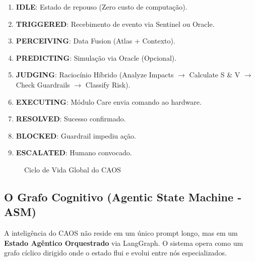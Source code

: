 \documentclass[12pt, a4paper]{article}
\begin{document}
\begin{enumerate}
    \item \textbf{IDLE}: Estado de repouso (Zero custo de computação).
    \item \textbf{TRIGGERED}: Recebimento de evento via Sentinel ou Oracle.
    \item \textbf{PERCEIVING}: Data Fusion (Atlas + Contexto).
    \item \textbf{PREDICTING}: Simulação via Oracle (Opcional).
    \item \textbf{JUDGING}: Raciocínio Híbrido (Analyze Impacts $\rightarrow$ Calculate S \& V $\rightarrow$ Check Guardrails $\rightarrow$ Classify Risk).
    \item \textbf{EXECUTING}: Módulo Care envia comando ao hardware.
    \item \textbf{RESOLVED}: Sucesso confirmado.
    \item \textbf{BLOCKED}: Guardrail impediu ação.
    \item \textbf{ESCALATED}: Humano convocado.
\end{enumerate}

\begin{figure}[h!]
    \centering
    \caption{Ciclo de Vida Global do CAOS}
    \label{fig:global_fsm}
\end{figure}

\subsection{O Grafo Cognitivo (Agentic State Machine - ASM)}
\label{sec:cognitive_graph}

A inteligência do CAOS não reside em um único prompt longo, mas em um \textbf{Estado Agêntico Orquestrado} via LangGraph. O sistema opera como um grafo cíclico dirigido onde o estado flui e evolui entre nós especializados.
\end{document}
